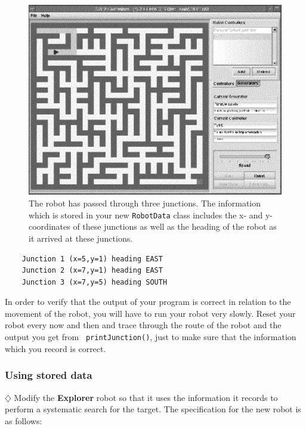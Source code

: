 \begin{figure}[t]
\centering
\includegraphics[width=4.5in]{helpful.pdf}
\caption{The robot has passed through three junctions. The information
which is stored in your new {\tt RobotData} class includes the x- and
y-coordinates of these junctions as well as the heading of the robot 
as it arrived at these junctions.
\label{helpful}}
\end{figure}

\begin{verbatim}
    Junction 1 (x=5,y=1) heading EAST
    Junction 2 (x=7,y=1) heading EAST
    Junction 3 (x=7,y=5) heading SOUTH
\end{verbatim}

\noindent
In order to verify that the output of your program is correct in
relation to the movement of the robot, you will have to run your
robot very slowly. Reset your robot every now and then and trace
through the route of the robot and the output you get from {\tt
printJunction()}, just to make sure that the information which you
record is correct.



\subsubsection{Using stored data}

$\diamondsuit$
Modify the {\bf Explorer} robot so that it uses the information it records to
perform a systematic search for the target. The specification for the new
robot is as follows:

